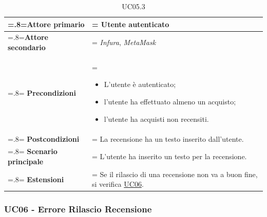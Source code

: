                 \begin{table}[H]
                    \centering
                    \renewcommand{\arraystretch}{1.8}
                    \renewcommand\tabularxcolumn[1]{m{#1}}
                    \begin{tabularx}{0.9\textwidth}{
                        >{\hsize=.8\hsize\linewidth=\hsize}X
                        >{\hsize=1.2\hsize\linewidth=\hsize}X}
                        \hline
                        \textbf{Attore primario} & Utente autenticato \\
                        \hline
                        \textbf{Attore secondario} & \textit{Infura}, \textit{MetaMask} \\
                        \hline
                        \textbf{Precondizioni} &
                            \begin{itemize}
                                \item L'utente è autenticato;
                                \item l'utente ha effettuato almeno un acquisto;
                                \item l'utente ha acquisti non recensiti.
                            \end{itemize} \\
                        \hline
                        \textbf{Postcondizioni} & La recensione ha un testo inserito dall'utente. \\
                        \hline
                        \textbf{Scenario principale} &
                        L'utente ha inserito un testo per la recensione. \\
                        \hline
                        \textbf{Estensioni} & Se il rilascio di una recensione non va a buon fine, si verifica \hyperref[UC06]{UC06}. \\
                        \hline
                    \end{tabularx}
                    \caption{UC05.3}
                \end{table}

        \subsubsection{UC06 - Errore Rilascio Recensione}
        \label{UC06}

